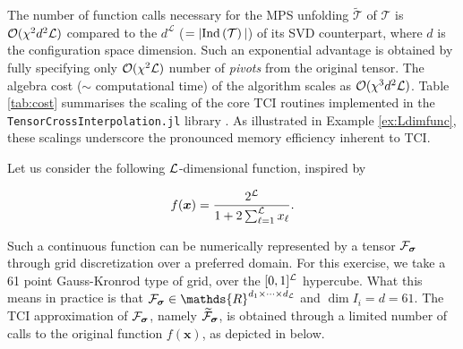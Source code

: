 The number of function calls necessary for the MPS unfolding $\widetilde{\mathcal{T}}$ of $\mathcal{T}$ is $\mathcal{O} (\chi^2d^2\mathcal{L})$ compared to the $d^\mathcal{L}$ ($= |\text{Ind}\left(\mathcal{T}\right)|$) of its SVD counterpart, where $d$ is the configuration space dimension. Such an exponential advantage is obtained by fully specifying only $\mathcal{O} (\chi^2\mathcal{L})$ number of \textit{pivots} from the original tensor. The algebra cost ($\sim$ computational time) of the algorithm scales as $\mathcal{O} (\chi^3d^2\mathcal{L})$. Table \ref{tab:cost} summarises the scaling of the core TCI routines implemented in the \texttt{TensorCrossInterpolation.jl} library \cite{TensorCrossInterpolation.jl}. As illustrated in Example \ref{ex:Ldimfunc}, these scalings underscore the pronounced memory efficiency inherent to TCI.
\begin{example} Let us consider the following $\mathcal{L}$-dimensional function, inspired by \cite{Fernandez2024}

\begin{equation}
	f(\boldsymbol{x}) = 
   \frac{2^{\mathcal{L}}}{1 + 2 \sum^{\mathcal{L}}_{\ell=1} x_\ell} .
   \label{eq:Ldimfunc}
\end{equation}

Such a continuous function can be numerically represented by a tensor $\mathcal{F}_{\boldsymbol{\sigma}}$ through grid discretization over a preferred domain. For this exercise, we take a 61 point Gauss-Kronrod type of grid, over the $[0,1]^{\mathcal{L}}$ hypercube. What this means in practice is that $\mathcal{F}_{\bsigma} \in \mathds{R}^{d_1\times\dots\times d_\mL}$ \footnotemark\; and $\dim I_i = d = 61$. The TCI approximation of $\mathcal{F}_{\boldsymbol{\sigma}}$, namely $\widetilde{\mathcal{F}}_{\boldsymbol{\sigma}}$, is obtained through a limited number of calls to the original function $f(\boldsymbol{x})$, as depicted in  below. 



\end{example}

